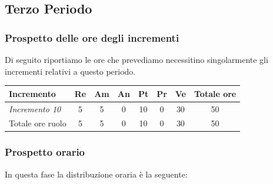 {{{{{{{{{{{{\subsection{Terzo Periodo}\label{PreventivoFaseDiProgettazioneDiDettaglioECodificaPeriodo3}

\subsubsection{Prospetto delle ore degli incrementi}\label{PreventivoFaseDiProgettazioneDiDettaglioECodificaPeriodo3Incrementi}
Di seguito riportiamo le ore che prevediamo necessitino singolarmente gli incrementi relativi a questo periodo.
\quad
\def\tabularxcolumn#1{m{#1}}
{
	
	\begin{center}
		\renewcommand{\arraystretch}{1.4}
		\begin{tabularx}{\textwidth}{|X|c|c|c|c|c|c|c|}
			\hline
			\rowcolor{airforceblue}
			\textbf{Incremento} & \textbf{Re} & \textbf{Am} & \textbf{An} & \textbf{Pt} & \textbf{Pr} & \textbf{Ve} & \textbf{Totale ore}\\
			\hline
			\textit{Incremento 10} & 5 & 5 & 0 & 10 & 0 & 30 & 50\\
			\hline
			Totale ore ruolo & 5 & 5 & 0 & 10 & 0 & 30 & 50\\
			\hline
		\end{tabularx}
	\end{center}
	
	\subsubsection{Prospetto orario}\label{PreventivoFaseDiProgettazioneDiDettaglioECodificaProspettoOrarioPeriodo3}
	In questa fase la distribuzione oraria è la seguente:
	\quad
	\def\tabularxcolumn#1{m{#1}}
	{
		
}}}}}}}}}}}}}}
